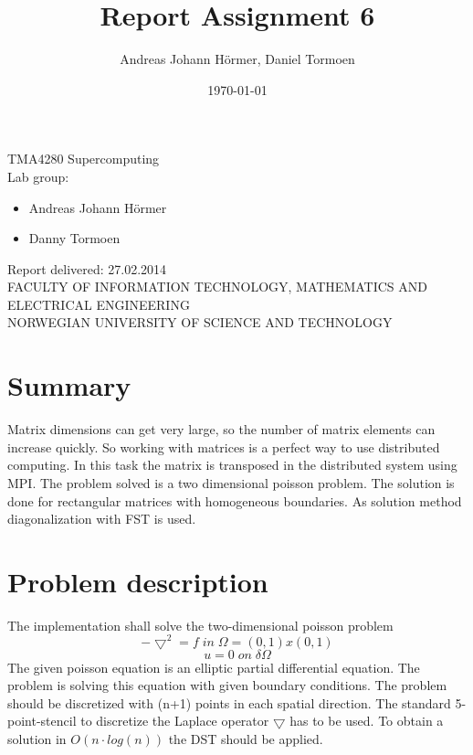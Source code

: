 \documentclass{article}
\title{Report Assignment 6}
\author{Andreas Johann H\"ormer, Daniel Tormoen}
\date{\today}
\begin{document}
\thispagestyle{empty}
\maketitle
\thispagestyle{empty}
\begin{center}
TMA4280 Supercomputing\\[3cm]
Lab group:
\begin{itemize}
\item Andreas Johann H\"ormer
\item Danny Tormoen\\[3cm]
\end{itemize}
Report delivered: 27.02.2014\\[6cm]
FACULTY OF INFORMATION TECHNOLOGY, MATHEMATICS AND ELECTRICAL ENGINEERING\\
NORWEGIAN UNIVERSITY OF SCIENCE AND TECHNOLOGY
\end{center}
\thispagestyle{empty}
\newpage
\tableofcontents
\thispagestyle{empty}
\newpage
\section*{Summary}
\thispagestyle{empty}
Matrix dimensions can get very large, so the number of matrix elements can increase quickly. So working with matrices is a perfect way to use distributed computing. In this task the matrix is transposed in the distributed system using MPI. The problem solved is a two dimensional poisson problem. The solution is done for rectangular matrices with homogeneous boundaries. As solution method diagonalization with FST is used.
\newpage
\setcounter{page}{1}
\section{Problem description}
The implementation shall solve the two-dimensional poisson problem 
\begin{equation}
-\bigtriangledown^2=f\;in\;\Omega = (0,1)x(0,1)
\end{equation}
\begin{equation}
u = 0\;on\;\delta\Omega
\end{equation}
The given poisson equation is an elliptic partial differential equation. The problem is solving this equation with given boundary conditions. 
The problem should be discretized with (n+1) points in each spatial direction. The standard 5-point-stencil to discretize the Laplace operator $\bigtriangledown$ has to be used. To obtain a solution in $O(n\cdot log(n))$ the DST should be applied.
\end{document}

